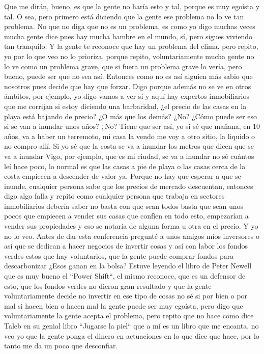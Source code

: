 Que me dirán, bueno, es que la gente no haría esto y tal, porque es muy egoísta y tal. O sea, pero primero está diciendo que la gente ese problema no lo ve tan problema. No que no diga que no es un problema, es como yo digo muchas veces mucha gente dice pues hay mucha hambre en el mundo, sí, pero sigues viviendo tan tranquilo. Y la gente te reconoce que hay un problema del clima, pero repito, yo por lo que veo no lo prioriza, porque repito, voluntariamente mucha gente no lo ve como un problema grave, que si fuera un problema grave lo vería, pero bueno, puede ser que no sea así. Entonces como no es así alguien más sabio que nosotros pues decide que hay que forzar. Digo porque además no se ve en otros ámbitos, por ejemplo, yo digo vamos a ver si y aquí hay expertos inmobiliarios que me corrijan si estoy diciendo una barbaridad, ¿el precio de las casas en la playa está bajando de precio? ¿O más que los demás? ¿No? ¿Cómo puede ser eso si se van a inundar unos años? ¿No? Tiene que ser así, yo si sé que mañana, en 10 años, va a haber un terremoto, mi casa la vendo me voy a otro sitio, la liquido o no compro allí. Si yo sé que la costa se va a inundar los metros que dicen que se va a inundar Vigo, por ejemplo, que es mi ciudad, se va a inundar no sé cuántos leí hace poco, lo normal es que las casas a pie de playa o las casas cerca de la costa empiecen a descender de valor ya. Porque no hay que esperar a que se inunde, cualquier persona sabe que los precios de mercado descuentan, entonces digo algo falla y repito como cualquier persona que trabaja en sectores inmobiliarios debería saber no basta con que sean todos basta que sean unos pocos que empiecen a vender sus casas que confíen en todo esto, empezarían a vender sus propiedades y eso se notaría de alguna forma u otra en el precio. Y yo no lo veo. Antes de dar esta conferencia pregunté a unos amigos míos inversores o así que se dedican a hacer negocios de invertir cosas y así con labor los fondos verdes estos que hay voluntarios, que la gente puede comprar fondos para descarbonizar ¿Esos ganan en la bolsa? Estuve leyendo el libro de Peter Newell que es muy bueno el ``Power Shift``\cite{Newell_2021}, el mismo reconoce, que es un defensor de esto, que los fondos verdes no dieron gran resultado y que la gente voluntariamente decide no invertir en ese tipo de cosas no sé si por bien o por mal si hacen bien o hacen mal la gente puede ser muy egoísta, pero digo que voluntariamente la gente acepta el problema, pero repito que no hace como dice Taleb en su genial libro ``Jugarse la piel``\cite{taleb2018skin} que a mí es un libro que me encanta, no veo yo que la gente ponga el dinero en actuaciones en lo que dice que hace, por lo tanto me da un poco que desconfiar. 

